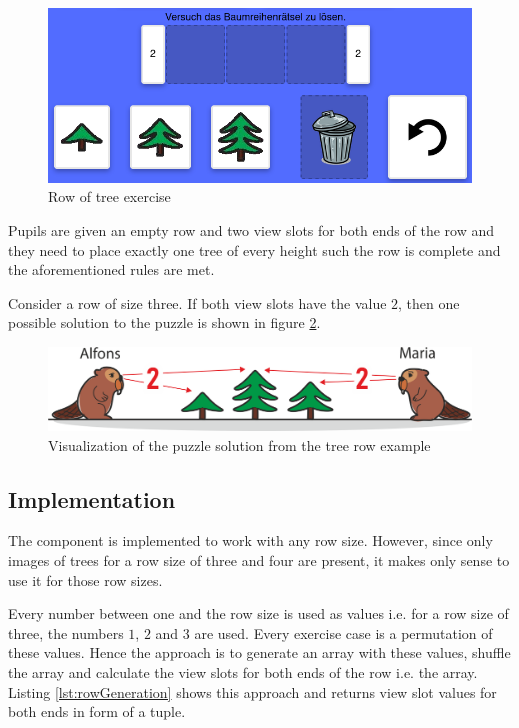 \begin{figure} 
    \centering
    \includegraphics[width=0.8 \columnwidth]{figures/tree_row_example_exercise.png}
    \caption{Row of tree exercise} 
    \label{fig:tree_row_example_exercise} 
\end{figure}

Pupils are given an empty row and two view slots for both ends of the row and they need to place exactly one tree of every height such the row is complete and the aforementioned rules are met.

\begin{example}
    Consider a row of size three. If both view slots have the value $2$, then one possible solution to the puzzle is shown in figure \ref{fig:tree_row_visible_tree}.
\end{example}

\begin{figure} 
    \centering
    \includegraphics[width=0.8 \columnwidth]{figures/tree_row_example.png}
    \caption{Visualization of the puzzle solution from the tree row example} 
    \label{fig:tree_row_visible_tree} 
\end{figure}

\subsection{Implementation}

The  component is implemented to work with any row size. However, since only images of trees for a row size of three and four are present, it makes only sense to use it for those row sizes.

Every number between one and the row size is used as values i.e. for a row size of three, the numbers $1$, $2$ and $3$ are used. Every exercise case is a permutation of these values. Hence the approach is to generate an array with these values, shuffle the array and calculate the view slots for both ends of the row i.e. the array. Listing \ref{lst:rowGeneration} shows this approach and returns view slot values for both ends in form of a tuple.

